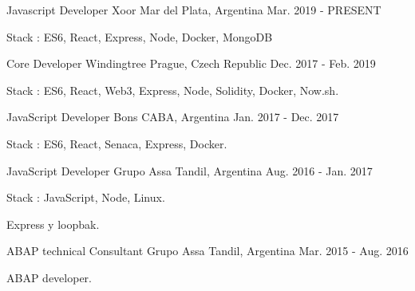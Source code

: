 


\begin{cventries}

\cventry
{Javascript Developer} %
{Xoor} %
{Mar del Plata, Argentina} %
{Mar. 2019 - PRESENT} %
{ %
\begin{cvitems}
\item {Stack : ES6, React, Express, Node, Docker, MongoDB}
\end{cvitems}
}
\cventry
{Core Developer} %
{Windingtree} %
{Prague, Czech Republic} %
{Dec. 2017 - Feb. 2019} %
{ %
\begin{cvitems}
\item {Stack : ES6, React, Web3, Express, Node, Solidity, Docker, Now.sh.}
\end{cvitems}
}
\cventry
{ JavaScript Developer} %
{Bons} %
{CABA, Argentina} %
{Jan. 2017 - Dec. 2017} %
{ %
\begin{cvitems}
\item {Stack : ES6, React, Senaca, Express, Docker.}
\end{cvitems}
}
\cventry
{ JavaScript Developer} %
{Grupo Assa} %
{Tandil, Argentina} %
{Aug. 2016 - Jan. 2017} %
{ %
\begin{cvitems}
\item {Stack : JavaScript, Node, Linux.}
\item {Express y loopbak.}
\end{cvitems}
}

\cventry
{ABAP technical Consultant} %
{Grupo Assa} %
{Tandil, Argentina} %
{Mar. 2015 - Aug. 2016} %
{ %
\begin{cvitems}
\item {ABAP developer.}
\end{cvitems}
}

\end{cventries}
